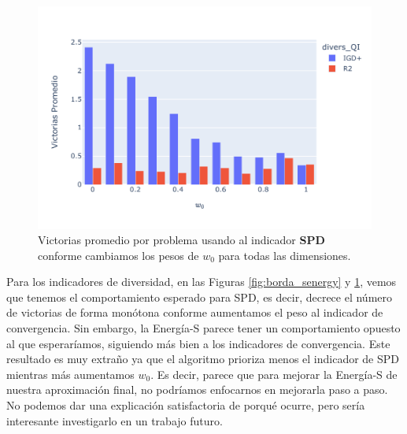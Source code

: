 \begin{figure} [H]
    \centering
    \includegraphics[width=\textwidth]{Figuras/borda_obj_ind_spd.pdf}
\caption[Conteo de borda IGD+]{Victorias promedio por problema usando al indicador \textbf{SPD} conforme cambiamos los pesos de $w_0$ para todas las dimensiones.}
\label{fig:borda_spd}
\end{figure}



Para los indicadores de diversidad, en las Figuras \ref{fig:borda_senergy} y \ref{fig:borda_spd}, vemos que tenemos el comportamiento esperado para SPD, es decir, decrece el número de victorias de forma monótona conforme aumentamos el peso al indicador de convergencia. Sin embargo, la Energía-S parece tener un comportamiento opuesto al que esperaríamos, siguiendo más bien a los indicadores de convergencia. Este resultado es muy extraño ya que el algoritmo prioriza menos el indicador de SPD mientras más aumentamos $w_0$. Es decir, parece que para mejorar la Energía-S de nuestra aproximación final, no podríamos enfocarnos en mejorarla paso a paso. No podemos dar una explicación satisfactoria de porqué ocurre, pero sería interesante investigarlo en un trabajo futuro.





